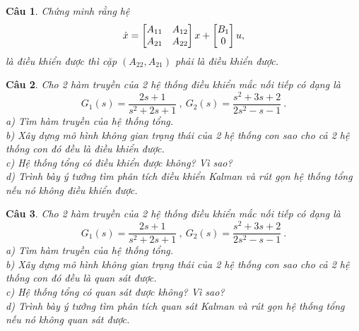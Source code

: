 \documentclass[11pt]{article}
\newtheorem{bt}{Câu}
\begin{document}
\begin{bt}
Chứng minh rằng hệ 
%
\begin{equation}
	\dot{x} = \begin{bmatrix} A_{11} & A_{12} \\ A_{21} & A_{22} \end{bmatrix} x + \begin{bmatrix} B_1 \\ 0 \end{bmatrix} u,
\end{equation}
%
là điều khiển được thì cặp $(A_{22},A_{21})$ phải là điều khiển được.
\end{bt}

\begin{bt}
	Cho 2 hàm truyền của 2 hệ thống điều khiển mắc nối tiếp có dạng là
	\begin{equation*}
		G_1(s) = \dfrac{2s+1}{s^2+2s+1} \ , \	G_2(s) = \dfrac{s^2+3s+2}{2s^2-s-1} \ . 
	\end{equation*}
	a) Tìm hàm truyền của hệ thống tổng. \\
	b) Xây dựng mô hình không gian trạng thái của 2 hệ thống con sao cho cả 2 hệ thống con đó đều là điều khiển được. \\
	c) Hệ thống tổng có điều khiển được không? Vì sao? \\
	d) Trình bày ý tưởng tìm phân tích điều khiển Kalman và rút gọn hệ thống tổng
	nếu nó không điều khiển được.
\end{bt}

\begin{bt}
	Cho 2 hàm truyền của 2 hệ thống điều khiển mắc nối tiếp có dạng là
	\begin{equation*}
		G_1(s) = \dfrac{2s+1}{s^2+2s+1} \ , \	G_2(s) = \dfrac{s^2+3s+2}{2s^2-s-1} \ . 
	\end{equation*}
	a) Tìm hàm truyền của hệ thống tổng. \\
	b) Xây dựng mô hình không gian trạng thái của 2 hệ thống con sao cho cả 2 hệ thống con đó đều là quan sát được. \\
	c) Hệ thống tổng có quan sát được không? Vì sao? \\
	d) Trình bày ý tưởng tìm phân tích quan sát Kalman và rút gọn hệ thống tổng
	nếu nó không quan sát được.
\end{bt}
	
\end{document}
